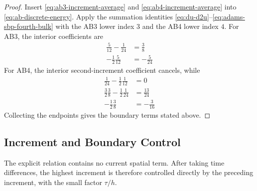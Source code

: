 \documentclass[11pt]{article}
\begin{document}
\begin{proof}
Insert \eqref{eq:ab3-increment-average} and
\eqref{eq:ab4-increment-average} into \eqref{eq:ab-discrete-energy}. Apply
the summation identities
\eqref{eq:du-d2u}--\eqref{eq:adams-sbp-fourth-bulk} with the AB3 lower index
\(3\) and the AB4 lower index \(4\). For AB3, the interior coefficients are
\begin{align}
\frac5{12}-\frac1{24}&=\frac38 \label{eq:ab3-second-increment-coefficient}\\
-\frac12\frac5{12}&=-\frac5{24} \label{eq:ab3-third-increment-coefficient}
\end{align}
For AB4, the interior second-increment coefficient cancels, while
\begin{align}
\frac1{24}-\frac12\frac1{12}&=0 \label{eq:ab4-second-increment-cancellation}\\
\frac32\frac38-\frac12\frac1{24}&=\frac{13}{24}
\label{eq:ab4-third-increment-coefficient}\\
-\frac12\frac38&=-\frac3{16} \label{eq:ab4-fourth-increment-coefficient}
\end{align}
Collecting the endpoints gives the boundary terms stated above.
\end{proof}


\subsection{Increment and Boundary Control}
\label{subsec:adams-bashforth-increments}

The explicit relation contains no current spatial term. After taking time
differences, the highest increment is therefore controlled directly by the
preceding increment, with the small factor \(\tau/h\).
\end{document}
